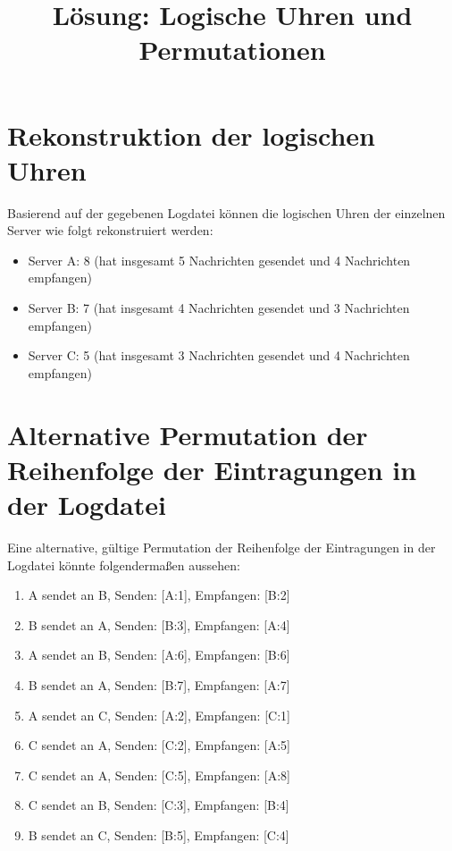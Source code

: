 \documentclass{article}
\begin{document}
\title{Lösung: Logische Uhren und Permutationen}
\maketitle

\section*{Rekonstruktion der logischen Uhren}

Basierend auf der gegebenen Logdatei können die logischen Uhren der einzelnen Server wie folgt rekonstruiert werden:

\begin{itemize}
  \item Server A: 8 (hat insgesamt 5 Nachrichten gesendet und 4 Nachrichten empfangen)
  \item Server B: 7 (hat insgesamt 4 Nachrichten gesendet und 3 Nachrichten empfangen)
  \item Server C: 5 (hat insgesamt 3 Nachrichten gesendet und 4 Nachrichten empfangen)
\end{itemize}

\section*{Alternative Permutation der Reihenfolge der Eintragungen in der Logdatei}

Eine alternative, gültige Permutation der Reihenfolge der Eintragungen in der Logdatei könnte folgendermaßen aussehen:

\begin{enumerate}
  \item A sendet an B, Senden: [A:1], Empfangen: [B:2]
  \item B sendet an A, Senden: [B:3], Empfangen: [A:4]
  \item A sendet an B, Senden: [A:6], Empfangen: [B:6]
  \item B sendet an A, Senden: [B:7], Empfangen: [A:7]
  \item A sendet an C, Senden: [A:2], Empfangen: [C:1]
  \item C sendet an A, Senden: [C:2], Empfangen: [A:5]
  \item C sendet an A, Senden: [C:5], Empfangen: [A:8]
  \item C sendet an B, Senden: [C:3], Empfangen: [B:4]
  \item B sendet an C, Senden: [B:5], Empfangen: [C:4]
\end{enumerate}
\end{document}
